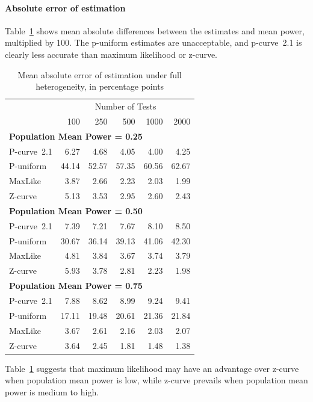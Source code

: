 \documentclass[jou]{apa6} %
\begin{document}
\paragraph{Absolute error of estimation} Table~\ref{fullabserr} shows mean absolute differences between the estimates and mean power, multiplied by 100. The p-uniform estimates are unacceptable, and p-curve~2.1 is clearly less accurate than maximum likelihood or z-curve. 
\begin{table} %
\caption{Mean absolute error of estimation under full heterogeneity, in percentage points}
{\small
\begin{center}
\begin{tabular}{lrrrrr}  \hline
      & \multicolumn{5}{c}{Number of Tests} \\
           &  100  &  250   &  500   & 1000   & 2000 \\ \hline
      \multicolumn{6}{l}{\textbf{Population Mean Power = 0.25}} \\ \hline
P-curve~2.1    & 6.27  &  4.68  &  4.05  &  4.00  &  4.25 \\
P-uniform  & 44.14 & 52.57  & 57.35  & 60.56  & 62.67 \\
MaxLike    & 3.87  &  2.66  &  2.23  &  2.03  &  1.99 \\
Z-curve    & 5.13  &  3.53  &  2.95  &  2.60  &  2.43 \\ \hline
\multicolumn{6}{l}{\textbf{Population Mean Power = 0.50}} \\ \hline
P-curve~2.1    & 7.39  &  7.21  &  7.67  &  8.10  &  8.50 \\
P-uniform  & 30.67 & 36.14  & 39.13  & 41.06  & 42.30 \\
MaxLike    & 4.81  &  3.84  &  3.67  &  3.74  &  3.79 \\
Z-curve    & 5.93  &  3.78  &  2.81  &  2.23  &  1.98 \\ \hline
\multicolumn{6}{l}{\textbf{Population Mean Power = 0.75}} \\ \hline
P-curve~2.1    & 7.88  &  8.62  &  8.99  &  9.24  &  9.41 \\
P-uniform  & 17.11 & 19.48  & 20.61  & 21.36  & 21.84 \\
MaxLike    & 3.67  &  2.61  &  2.16  &  2.03  &  2.07 \\
Z-curve    & 3.64  &  2.45  &  1.81  &  1.48  &  1.38 \\ \hline
\end{tabular}
\end{center}
} %
\label{fullabserr}  %
\end{table}
Table~\ref{fullabserr} suggests that maximum likelihood may have an advantage over z-curve when population mean power is low, while z-curve prevails when population mean power is medium to high. 
\end{document}
